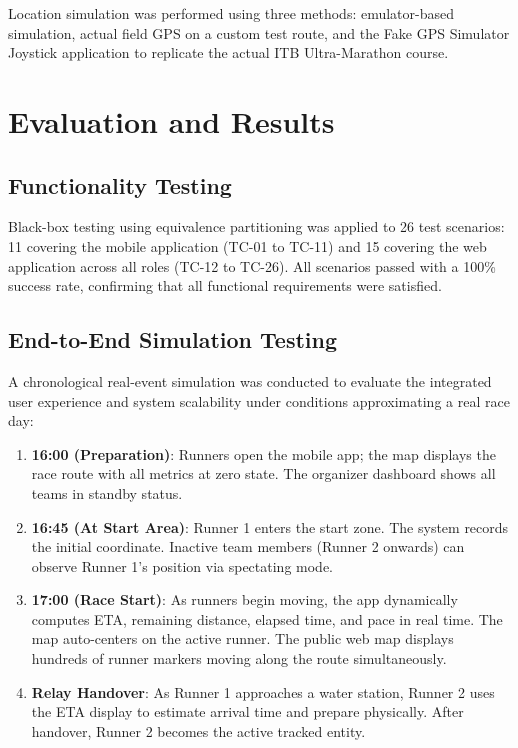 \documentclass[conference]{IEEEtran}
\begin{document}
Location simulation was performed using three methods: emulator-based simulation, actual field GPS on a custom test route, and the Fake GPS Simulator Joystick application to replicate the actual ITB Ultra-Marathon course.

\section{Evaluation and Results}

\subsection{Functionality Testing}
Black-box testing using equivalence partitioning was applied to 26 test scenarios: 11 covering the mobile application (TC-01 to TC-11) and 15 covering the web application across all roles (TC-12 to TC-26). All scenarios passed with a 100\% success rate, confirming that all functional requirements were satisfied.

\subsection{End-to-End Simulation Testing}
A chronological real-event simulation was conducted to evaluate the integrated user experience and system scalability under conditions approximating a real race day:

\begin{enumerate}
    \item \textbf{16:00 (Preparation)}: Runners open the mobile app; the map displays the race route with all metrics at zero state. The organizer dashboard shows all teams in standby status.
    \item \textbf{16:45 (At Start Area)}: Runner 1 enters the start zone. The system records the initial coordinate. Inactive team members (Runner 2 onwards) can observe Runner 1's position via spectating mode.
    \item \textbf{17:00 (Race Start)}: As runners begin moving, the app dynamically computes ETA, remaining distance, elapsed time, and pace in real time. The map auto-centers on the active runner. The public web map displays hundreds of runner markers moving along the route simultaneously.
    \item \textbf{Relay Handover}: As Runner 1 approaches a water station, Runner 2 uses the ETA display to estimate arrival time and prepare physically. After handover, Runner 2 becomes the active tracked entity.
\end{enumerate}
\end{document}
